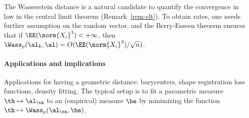 \begin{rem}
The Wasserstein distance is a natural candidate to quantify the convergence in law in the central limit theorem (Remark~\ref{rem-clt}). To obtain rates, one needs further assumption on the random vector, and the Berry-Esseen theorem ensures that if $\EE(\norm{X_i}^3)<+\infty$, then $\Wass_p(\al_k,\al) = O(\EE(\norm{X_i}^3)/\sqrt{n})$.
\end{rem}
 
 
\paragraph{Applications and implications}

Applications for having a geometric distance: barycenters, shape registration loss functions, density fitting.
%
The typical setup is to fit a parametric measure $\th \mapsto \al_\th$ to an (empirical) measure $\be$ by minimizing the function $\th \mapsto \Wass_p(\al_\th,\be)$.



